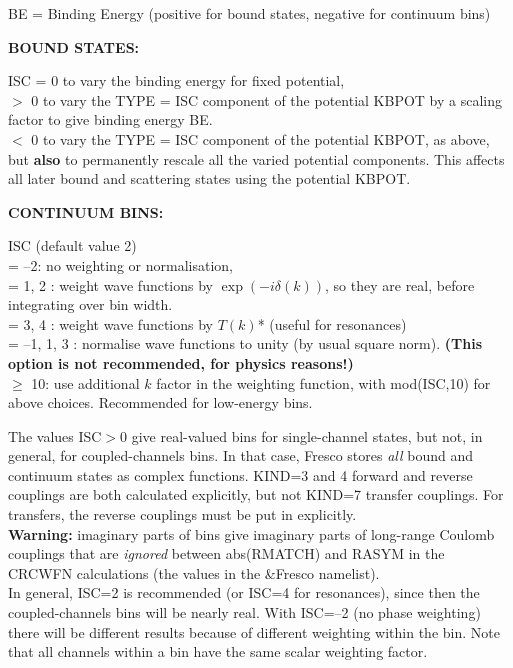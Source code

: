 \documentclass[11pt]{article}
\begin{document}
\begin{description}
BE = Binding Energy (positive for bound states, negative for
continuum bins)


\bigskip
{\bf BOUND STATES:}


 ISC
      = 0 to vary the binding energy for fixed potential,
\\  $>$ 0 to vary the TYPE = ISC component of the potential KBPOT
by a scaling factor to give binding energy BE.
\\  $<$ 0 to vary the TYPE = ISC component of the potential KBPOT,
as above, but {\bf also} to permanently rescale all the varied potential
components. This affects all later bound and scattering states using
the potential KBPOT.



\bigskip
{\bf CONTINUUM BINS:}


 ISC   (default value 2)\\
      = --2: no weighting or normalisation,
\\  = 1, 2 : weight wave functions by $\exp(-i\delta(k))$,
so they are real, before integrating over bin width.
\\  = 3, 4 : weight wave functions by $T(k)$* (useful for resonances)
\\  = --1, 1, 3 : normalise wave functions to unity (by usual square norm).
{\bf (This option is not recommended, for physics reasons!)}
\\  $\geq$ 10: use additional $k$ factor in the weighting function, with
mod(ISC,10) for above choices. Recommended for low-energy  bins.

The values ISC$>$0 give real-valued bins for single-channel states,
but not, in general, for coupled-channels bins. In that case, Fresco stores
{\em all} bound and continuum states as complex functions.
KIND=3 and 4 forward and reverse couplings are both calculated
explicitly, but not KIND=7 transfer couplings. For transfers, the
reverse couplings must be put in explicitly.\\
{\bf Warning:} imaginary parts of bins give imaginary parts of long-range
Coulomb couplings that are {\em ignored} between abs(RMATCH) and RASYM
in the CRCWFN calculations (the values in the \&Fresco namelist).\\
In general, ISC=2 is recommended (or ISC=4 for resonances), since then
the coupled-channels bins will be nearly real. With ISC=--2 (no phase weighting)
there will be  different results because of different weighting within the
bin. Note that all channels within a bin have the same scalar
weighting factor.



\end{description}
\end{document}
